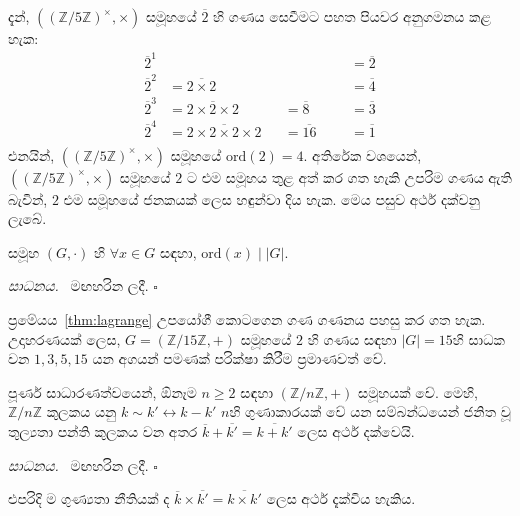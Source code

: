 \documentclass[10pt]{book}
\def\ord{\mathrm{ord}}
\newenvironment{proof}[1][සාධනය]{%
  \par\noindent\textsl{#1.}\ }%
  {\hfill$\square$\par}%
\begin{document}
\begin{example}
දැන්, $((\mathbb{Z}/5\mathbb{Z})^\times, \times)$ සමූහයේ $\overline{2}$ හි ගණය සෙවීමට පහත පියවර අනුගමනය කළ හැක:
\begin{align*}
\overline{2}^1 &{}                                   &&{}               &&&= \overline{2}\\
\overline{2}^2 &=\overline{2\times2}                 &&{}               &&&= \overline{4}\\
\overline{2}^3 &=\overline{2\times2\times2}          &&= \overline{8}   &&&= \overline{3} \\
\overline{2}^4 &=\overline{2\times2\times2\times2}   &&= \overline{16}  &&&= \overline{1} \\
\end{align*}
එනයින්, $((\mathbb{Z}/5\mathbb{Z})^\times, \times)$ සමූහයේ $\ord(2) = 4$.
අතිරේක වශයෙන්, $((\mathbb{Z}/5\mathbb{Z})^\times, \times)$ සමූහයේ $2$ ට එම සමූහය තුළ අත් කර ගත හැකි උපරිම ගණය ඇති බැවින්, $2$ එම සමූහයේ ජනකයක් ලෙස හඳුන්වා දිය හැක. මෙය පසුව අර්ථ දක්වනු ලැබේ.
\end{example}

\begin{theorem}[{}ලග්‍රේන්ජ්]
\label{thm:lagrange}
සමූහ $(G, \cdot)$ හි $\forall x \in G$ සඳහා, $\ord(x) \mid |G|$.
\end{theorem}
\begin{proof}
මඟහරින ලදී.
\end{proof}
ප්‍රමේයය~\ref{thm:lagrange} උපයෝගී කොටගෙන ගණ ගණනය පහසු කර ගත හැක. උදාහරණයක් ලෙස, $G = (\mathbb{Z}/15\mathbb{Z}, +)$ සමූහයේ $2$ හි ගණය සඳහා $|G| = 15$හි සාධක ව​න
$1,3,5,15$ යන අගයන් පමණක් පරික්ෂා කිරීම ප්‍රමාණවත් වේ.

\begin{lemma}
පූර්ණ සාධාරණත්වයෙන්, ඕනෑම $n \ge 2$ සඳහා $(\mathbb{Z}/n\mathbb{Z}, +)$ සමූහයක් වේ. මෙහි, $\mathbb{Z}/n\mathbb{Z}$ කුලක​ය යනු $k\sim k' \leftrightarrow k-k'$ $n$හි ගුණාකාරයක් ​වේ යන සම්බන්ධයෙන් ජනිත වූ තුල්‍යතා පන්ති කුලක​ය වන අතර $\overline{k} + \overline{k'} = \overline{k+k'}$ ලෙස අර්ථ දක්වෙයි.
\end{lemma}
\begin{proof}
මඟහරින ලදී.
\end{proof}

එපරිදි ම ගුණ්‍යතා නීතියක් ද $\overline{k} \times \overline{k'} = \overline{k\times k'}$ ලෙස අර්ථ දැක්විය හැකිය. 
\end{document}
